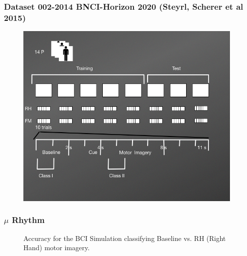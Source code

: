 \documentclass[aspectratio=169]{beamer}
\begin{document}
\begin{frame}
\frametitle{Dataset 002-2014 BNCI-Horizon 2020 (Steyrl, Scherer et al 2015)}
\begin{figure}[thpb]
\centering
\setlength\fboxsep{0pt}
\setlength\fboxrule{0.5pt}
\includegraphics[scale=0.35]{images/DatasetIIIDiagram2}    
\end{figure} 	
\end{frame}	

   \begin{frame}   
   \frametitle{$\mu$ Rhythm}
   \begin{figure}[thpb]
      \centering
      \setlength\fboxsep{0pt}
	  \setlength\fboxrule{0.5pt}
      \caption{\centering Accuracy for the BCI Simulation classifying Baseline vs. RH (Right Hand) motor imagery.}
      \label{figure3}
   \end{figure} 	
	\end{frame}	  
	
\end{document}
